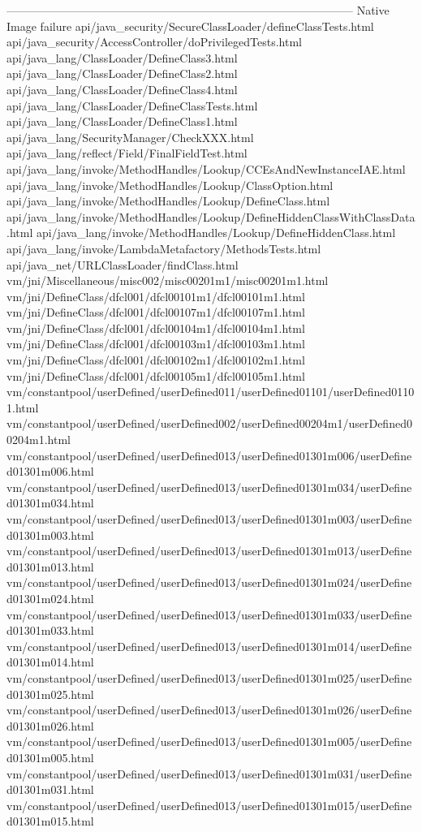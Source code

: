 --------------------------------------------------------------------------------------------
Native Image failure
api/java_security/SecureClassLoader/defineClassTests.html
api/java_security/AccessController/doPrivilegedTests.html
api/java_lang/ClassLoader/DefineClass3.html
api/java_lang/ClassLoader/DefineClass2.html
api/java_lang/ClassLoader/DefineClass4.html
api/java_lang/ClassLoader/DefineClassTests.html
api/java_lang/ClassLoader/DefineClass1.html
api/java_lang/SecurityManager/CheckXXX.html
api/java_lang/reflect/Field/FinalFieldTest.html
api/java_lang/invoke/MethodHandles/Lookup/CCEsAndNewInstanceIAE.html
api/java_lang/invoke/MethodHandles/Lookup/ClassOption.html
api/java_lang/invoke/MethodHandles/Lookup/DefineClass.html
api/java_lang/invoke/MethodHandles/Lookup/DefineHiddenClassWithClassData.html
api/java_lang/invoke/MethodHandles/Lookup/DefineHiddenClass.html
api/java_lang/invoke/LambdaMetafactory/MethodsTests.html
api/java_net/URLClassLoader/findClass.html
vm/jni/Miscellaneous/misc002/misc00201m1/misc00201m1.html
vm/jni/DefineClass/dfcl001/dfcl00101m1/dfcl00101m1.html
vm/jni/DefineClass/dfcl001/dfcl00107m1/dfcl00107m1.html
vm/jni/DefineClass/dfcl001/dfcl00104m1/dfcl00104m1.html
vm/jni/DefineClass/dfcl001/dfcl00103m1/dfcl00103m1.html
vm/jni/DefineClass/dfcl001/dfcl00102m1/dfcl00102m1.html
vm/jni/DefineClass/dfcl001/dfcl00105m1/dfcl00105m1.html
vm/constantpool/userDefined/userDefined011/userDefined01101/userDefined01101.html
vm/constantpool/userDefined/userDefined002/userDefined00204m1/userDefined00204m1.html
vm/constantpool/userDefined/userDefined013/userDefined01301m006/userDefined01301m006.html
vm/constantpool/userDefined/userDefined013/userDefined01301m034/userDefined01301m034.html
vm/constantpool/userDefined/userDefined013/userDefined01301m003/userDefined01301m003.html
vm/constantpool/userDefined/userDefined013/userDefined01301m013/userDefined01301m013.html
vm/constantpool/userDefined/userDefined013/userDefined01301m024/userDefined01301m024.html
vm/constantpool/userDefined/userDefined013/userDefined01301m033/userDefined01301m033.html
vm/constantpool/userDefined/userDefined013/userDefined01301m014/userDefined01301m014.html
vm/constantpool/userDefined/userDefined013/userDefined01301m025/userDefined01301m025.html
vm/constantpool/userDefined/userDefined013/userDefined01301m026/userDefined01301m026.html
vm/constantpool/userDefined/userDefined013/userDefined01301m005/userDefined01301m005.html
vm/constantpool/userDefined/userDefined013/userDefined01301m031/userDefined01301m031.html
vm/constantpool/userDefined/userDefined013/userDefined01301m015/userDefined01301m015.html
